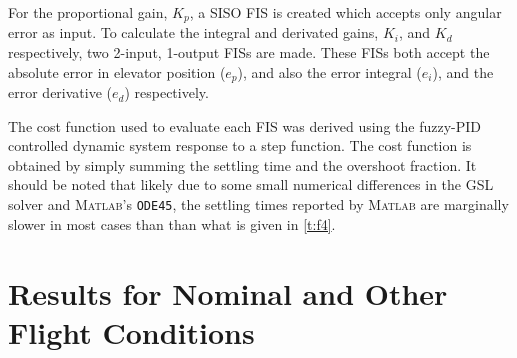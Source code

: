 For the proportional gain, $K_p$, a SISO FIS is created which accepts only angular error as input. To
calculate the integral and derivated gains, $K_i$, and $K_d$ respectively, two 2-input, 1-output FISs are
made. These FISs both accept the absolute error in elevator position ($e_p$), and also the error integral
($e_i$), and the error derivative ($e_d$) respectively.

The cost function used to evaluate each FIS was derived using the fuzzy-PID controlled dynamic system response
to a step function. The cost function is obtained by simply summing the settling time and the overshoot
fraction. It should be noted that likely due to some small numerical differences in the GSL solver and
\textsc{Matlab}'s \verb|ODE45|, the settling times reported by \textsc{Matlab} are marginally slower in most
cases than than what is given in \cref{t:f4}.

\section{Results for Nominal and Other Flight Conditions}

